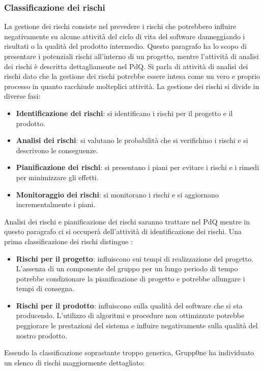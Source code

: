 \documentclass[../norme-di-progetto.tex]{subfiles}
\begin{document}
\subsubsection{Classificazione dei rischi}
\label{subs:classificazione dei rischi}
La gestione dei rischi consiste nel prevedere i rischi che potrebbero influire negativamente su alcune attività del ciclo di vita del software danneggiando i risultati o la qualità del prodotto intermedio. Questo paragrafo ha lo scopo di presentare i potenziali rischi all'interno di un progetto, mentre l'attività di analisi dei rischi è descritta dettagliamente nel PdQ. Si parla di attività di analisi dei rischi dato che la gestione dei rischi potrebbe essere intesa come un vero e proprio processo in quanto racchiude molteplici attività. La gestione dei rischi si divide in diverse fasi:
\begin{itemize}
	\item \textbf{Identificazione dei rischi}: si identificano i rischi per il progetto e il prodotto.
	\item \textbf{Analisi dei rischi}: si valutano le probabilità che si verifichino i rischi e si descrivono le conseguenze.
	\item \textbf{Pianificazione dei rischi}: si presentano i piani per evitare i rischi e i rimedi per minimizzare gli effetti.
	\item \textbf{Monitoraggio dei rischi}: si monitorano i rischi e si aggiornano incrementalmente i piani.
\end{itemize}
Analisi dei rischi e pianificazione dei rischi saranno trattare nel PdQ mentre in questo paragrafo ci si occuperà dell'attività di identificazione dei rischi.
Una prima classificazione dei rischi distingue :
\begin{itemize}
	\item \textbf{Rischi per il progetto}: influiscono sui tempi di realizzazione del progetto. L'assenza di un componente del gruppo per un lungo periodo di tempo potrebbe condizionare la pianificazione di progetto e potrebbe allungare i tempi di consegna.
	\item \textbf{Rischi per il prodotto}: influiscono sulla qualità del software che si sta producendo. L'utilizzo di algoritmi e procedure non ottimizzate potrebbe peggiorare le prestazioni del sistema e influire negativamente sulla qualità del nostro prodotto.
\end{itemize}
Essendo la classificazione soprastante troppo generica, Grupp0ne ha individuato un elenco di rischi maggiormente dettagliato:
\end{document}
